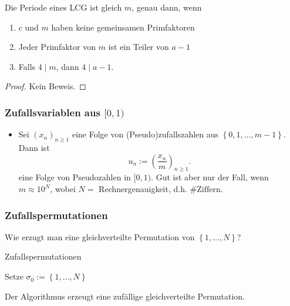 \begin{lemma}[Knuth]\label{lm:knuth}
    Die Periode eines LCG ist gleich $m$, genau dann, wenn
     \begin{enumerate}[label=\protect\circled{\alph*}]
        \item $c$ und  $m$ haben keine gemeinsamen Primfaktoren
        \item Jeder Primfaktor von  $m$ ist ein Teiler von  $a-1$ 
        \item Falls $4 \mid m$, dann $4 \mid  a-1$.
    \end{enumerate}
    \label{lm:knuth}
\end{lemma}
\begin{proof}
    Kein Beweis.
\end{proof}

\subsubsection{Zufallsvariablen aus $[0,1)$}
 \begin{itemize}
     \item Sei $(x_n)_{n\geq 1}$ eine Folge von (Pseudo)zufallszahlen aus $\left \{0,1,\ldots,m-1\right\} $. Dann ist
         \[
             u_n := \left(\frac{x_n}{m}\right)_{n\geq 1}
         .\] 
         eine Folge von Pseudozahlen in $[0,1)$. Gut ist aber nur der Fall, wenn $m\approx 10^N$, wobei $N=$ Rechnergenauigkeit, d.h. $\#\text{Ziffern}$.
\end{itemize}
\subsubsection{Zufallspermutationen}
\begin{question}
Wie erzugt man eine gleichverteilte Permutation von $\left \{1,\ldots,N\right\} $?
\end{question}
\begin{algorithm}[H]\label{alg:zufällige-permutation}
    \DontPrintSemicolon

    \caption{Zufallspermutationen}
    \;
    Setze $\sigma_0:=\left \{1,\ldots,N\right\} $\;
\end{algorithm}
\begin{lemma}
    Der Algorithmus erzeugt eine zufällige gleichverteilte Permutation.
\end{lemma}

